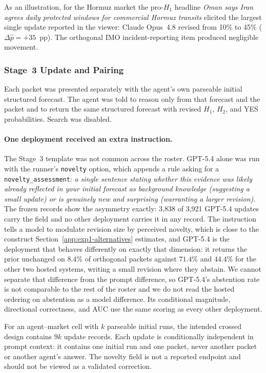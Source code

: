 As an illustration, for the Hormuz market the pro-$H_1$ headline
\textit{Oman says Iran agrees daily protected windows for commercial Hormuz transits}
elicited the largest single update reported in the viewer: Claude Opus~4.8 revised
from 10\% to 45\% (\(\Delta\hat p=+35\)~pp).  The orthogonal IMO
incident-reporting item produced negligible movement.

\subsubsection{Stage~3 Update and Pairing}
\label{app:update-protocol}

Each packet was presented separately with the agent's own parseable initial structured
forecast.  The agent was told to reason only from that forecast and the packet and to
return the same structured forecast with revised $H_1$, $H_2$, and YES probabilities.
Search was disabled.

\paragraph{One deployment received an extra instruction.}
The Stage~3 template was not common across the roster.  GPT-5.4 alone was run with the
runner's \texttt{novelty} option, which appends a rule asking for a
\texttt{novelty\_assessment}: \emph{a single sentence stating whether this evidence was
likely already reflected in your initial forecast as background knowledge (suggesting a
small update) or is genuinely new and surprising (warranting a larger revision)}.
The frozen records show the asymmetry exactly: 3{,}838 of 3{,}921 GPT-5.4 updates carry
the field and no other deployment carries it in any record.  The instruction tells a
model to modulate revision size by perceived novelty, which is close to the construct
Section~\ref{app:exp1-alternatives} estimates, and GPT-5.4 is the deployment that
behaves differently on exactly that dimension: it returns the prior unchanged on
$8.4\%$ of orthogonal packets against $71.4\%$ and $44.4\%$ for the other two hosted
systems, writing a small revision where they abstain.  We cannot separate that
difference from the prompt difference, so GPT-5.4's abstention rate is not comparable to
the rest of the roster and we do not read the hosted ordering on abstention as a model
difference.  Its conditional magnitude, directional correctness, and AUC use the same
scoring as every other deployment.

For an agent--market cell with \(k\) parseable initial runs, the intended crossed design
contains \(9k\) update records.  Each update is conditionally independent in prompt
context: it contains one initial run and one packet, never another packet or another
agent's answer.  The novelty field is not a reported endpoint and should not be
viewed as a validated correction.

